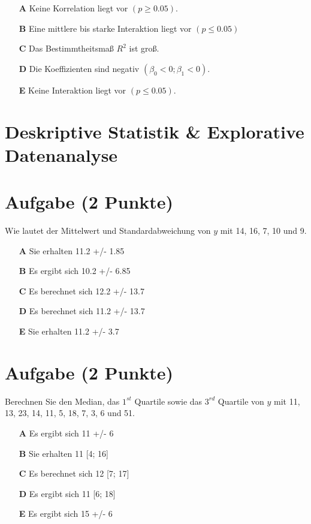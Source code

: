 \documentclass[a4paper, 9pt]{scrartcl}\usepackage[]{graphicx}\usepackage[]{xcolor}
\begin{document}
\begin{enumerate}
\item [\textbf{A} \msquare] Keine Korrelation liegt vor $(p \geq 0.05)$.
\item [\textbf{B} \msquare] Eine mittlere bis starke Interaktion liegt vor $(p \leq 0.05)$
\item [\textbf{C} \msquare] Das Bestimmtheitsmaß $R^2$ ist groß.
\item [\textbf{D} \msquare] Die Koeffizienten sind negativ $(\beta_0 < 0; \beta_1 < 0)$.
\item [\textbf{E} \msquare] Keine Interaktion liegt vor $(p \leq 0.05)$.
\end{enumerate} 
\section*{Deskriptive Statistik \& Explorative Datenanalyse}

\section{Aufgabe \hfill (2 Punkte)}




Wie lautet der Mittelwert und Standardabweichung von $y$ mit 14, 16, 7, 10 und 9.



\begin{enumerate}
\item [\textbf{A} \msquare] Sie erhalten 11.2 +/- 1.85
\item [\textbf{B} \msquare] Es ergibt sich 10.2 +/- 6.85
\item [\textbf{C} \msquare] Es berechnet sich 12.2 +/- 13.7
\item [\textbf{D} \msquare] Es berechnet sich 11.2 +/- 13.7
\item [\textbf{E} \msquare] Sie erhalten 11.2 +/- 3.7
\end{enumerate} 

\section{Aufgabe \hfill (2 Punkte)}




Berechnen Sie den Median, das $1^{st}$ Quartile sowie das $3^{rd}$ Quartile von $y$ mit 11, 13, 23, 14, 11, 5, 18, 7, 3, 6 und 51.




\begin{enumerate}
\item [\textbf{A} \msquare] Es ergibt sich 11 +/- 6
\item [\textbf{B} \msquare] Sie erhalten 11 [4; 16]
\item [\textbf{C} \msquare] Es berechnet sich 12 [7; 17]
\item [\textbf{D} \msquare] Es ergibt sich 11 [6; 18]
\item [\textbf{E} \msquare] Es ergibt sich 15 +/- 6
\end{enumerate} 
\end{document}
